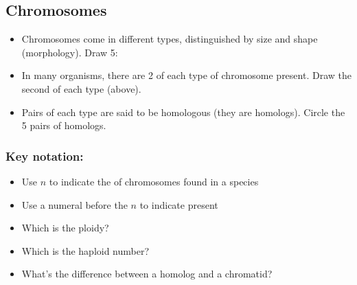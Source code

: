\subsection{Chromosomes}

\begin{frame}
    \begin{itemize}
        \item Chromosomes come in different types, distinguished by size and
            shape (morphology). Draw 5:
        \vspace{4cm}
        \item In many organisms, there are 2 of each type of chromosome
            present. Draw the second of each type (above).
        \item Pairs of each type are said to be homologous (they are homologs).
            Circle the 5 pairs of homologs.
    \end{itemize}

\end{frame}

\begin{frame}
    \frametitle{Key notation:}
    \begin{itemize}
        \item Use $n$ to indicate the  of
            chromosomes found in a species
        \item Use a numeral before the $n$ to indicate  present
        \item Which is the ploidy?
        \item Which is the haploid number?
        \item What's the difference between a homolog and a chromatid?
    \end{itemize}
\end{frame}

